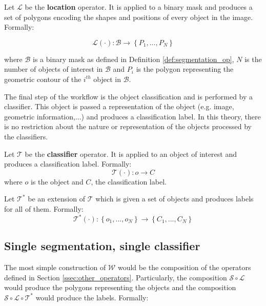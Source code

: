 \begin{definition} \label{def:locate_op}
Let $\mathcal{L}$ be the \textbf{location} operator. It is applied to a binary mask and produces a set of polygons encoding the shapes and positions of every object in the image. Formally:

\begin{equation}
	\mathcal{L}(\cdot) : \mathcal{B} \rightarrow \left\{P_1, ..., P_N\right\}
\end{equation}

where $\mathcal{B}$ is a binary mask as defined in Definition \ref{def:segmentation_op}, $N$ is the number of objects of interest in $\mathcal{B}$ and $P_i$ is the polygon representing the geometric contour of the $i^{th}$ object in $\mathcal{B}$.
\end{definition}

The final step of the workflow is the object classification and is performed by a classifier. This object is passed a representation of the object (e.g. image, geometric information,...) and produces a classification label. In this theory, there is no restriction about the nature or representation of the objects processed by the classifiers.

\begin{definition} Let $\mathcal{T}$ be the \textbf{classifier} operator. It is applied to an object of interest and produces a classification label. Formally:
\begin{equation}
	\mathcal{T}(\cdot) : o \rightarrow C
\end{equation}
where $o$ is the object and $C$, the classification label. 
\end{definition}
\begin{definition}
Let $\mathcal{T}^*$ be an extension of $\mathcal{T}$ which is given a set of objects and produces labels for all of them. Formally: 
\begin{equation}
	\mathcal{T}^*(\cdot) : \left\{o_1, ..., o_N\right\}  \rightarrow \left\{C_1, ..., C_N\right\}
\end{equation}
\end{definition}

\subsection{Single segmentation, single classifier}
\label{ssec:single_single}

The most simple construction of $\mathcal{W}$ would be the composition of the operators defined in Section \ref{ssec:other_operators}. Particularly, the composition $\mathcal{S} \circ \mathcal{L}$ would produce the polygons representing the objects and the composition $\mathcal{S} \circ \mathcal{L} \circ \mathcal{T}^*$ would produce the labels. Formally: 

